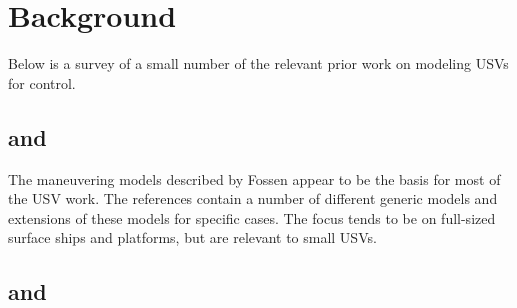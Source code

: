 \documentclass[11pt,draftcls,journal,onecolumn]{../latexlib/latex_ieee/IEEEtran}
\begin{document}
\section{Background}

Below is a survey of a small number of the relevant prior work on modeling USVs for control.  

\subsection{\cite{fossen94guidance} and \cite{fossen11handbook}}
The maneuvering models described by Fossen appear to be the basis for most of the USV work.  The references contain a number of different generic models and extensions of these models for specific cases.  The focus tends to be on full-sized surface ships and platforms, but are relevant to small USVs. 

\subsection{\cite{sonnenburg10control} and \cite{sonnenburg13modeling}}
\end{document}
